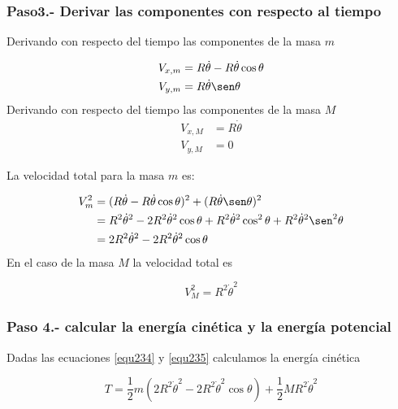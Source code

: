 \documentclass[12pt]{book}
\theoremstyle{definition}
\theoremstyle{remark}
\theoremstyle{plain}
\begin{document}
\subsubsection{Paso3.-  Derivar las componentes con respecto al tiempo}

Derivando con respecto del tiempo las componentes de la masa $m$

\begin{equation}
\label{equ232}
\begin{aligned}
V_{x,m} & =R \dot{\theta} - R \dot{\theta} \cos \theta \\
V_{y,m} & = R \dot{\theta} \sen \theta
\end{aligned}
\end{equation}
Derivando con respecto del tiempo las componentes de la masa $M$
\begin{equation}
\label{equ233}
\begin{aligned}
V_{x,M} & =R \dot{\theta} \\
V_{y,M} & = 0
\end{aligned}
\end{equation}

La velocidad total para la masa $m$ es:

\begin{equation}
\label{equ234}
\begin{aligned}
V_{m} ^2 &  = (R \dot{\theta} - R \dot{\theta} \cos \theta)^2+(R \dot{\theta} \sen \theta)^2 \\
 & = R^2 \dot{\theta}^2- 2 R^2 \dot{\theta}^2 \cos \theta + R^2 \dot{\theta}^2 \cos ^2 \theta + R^2 \dot{\theta}^2  \sen ^2 \theta \\
&  =2  R^2 \dot{\theta}^2- 2 R^2 \dot{\theta}^2 \cos \theta 
\end{aligned}
\end{equation}
En el caso de la masa $M$ la velocidad total es

\begin{equation}
\label{equ235}
V_M ^2=R ^2 \dot{\theta}^2 
\end{equation}

\subsubsection{Paso 4.- calcular la energía cinética y la energía potencial}
Dadas las ecuaciones \ref{equ234} y \ref{equ235} calculamos la energía cinética

\begin{equation}
\label{equ236}
T = \frac{1}{2} m (2  R^2 \dot{\theta}^2- 2 R^2 \dot{\theta}^2 \cos \theta )+\frac{1}{2} M R ^2 \dot{\theta}^2 
\end{equation}
\end{document}
